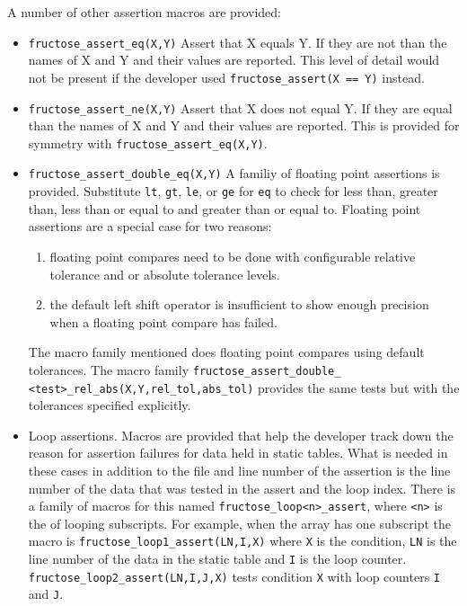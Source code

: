 \documentclass{book}
\begin{document}
A number of other assertion macros are provided:

\begin{itemize}
\item {\tt fructose\_assert\_eq(X,Y)}\hfil\break
Assert that X equals Y. If they are not than the names
of X and Y and their values are reported.
This level of detail would not be present if the
developer used\hfil\break
{\tt fructose\_assert(X == Y)} instead.

\item {\tt fructose\_assert\_ne(X,Y)}\hfil\break
Assert that X does not equal Y. If they are equal than the names
of X and Y and their values are reported.
This is provided for symmetry with 
{\tt fructose\_assert\_eq(X,Y)}.

\item {\tt fructose\_assert\_double\_eq(X,Y)}\hfil\break
A familiy of floating point assertions is provided.
Substitute {\tt lt}, {\tt gt},
{\tt le}, or {\tt ge} for {\tt eq} to check for less than,
greater than, less than or equal to and greater than or
equal to.
Floating point assertions are a special case for two reasons:
\begin{enumerate}
\item floating point compares need to be done with configurable relative
tolerance and or absolute tolerance levels. 
\item the default left shift operator is insufficient to show enough
precision when a floating point compare has failed. 
\end{enumerate}
The macro family mentioned 
does floating point compares using default tolerances.
The macro family\hfil\break
{\tt fructose\_assert\_double\_}
{\tt<test>\_rel\_abs(X,Y,rel\_tol,abs\_tol)}
provides the same tests but with the tolerances specified explicitly.

\item Loop assertions. \hfil\break
Macros are provided that help the developer track down the
reason for assertion failures for data held in static tables.
What is needed in these cases in addition to the file and line
number of the assertion is the line number of the data that
was tested in the assert and the loop index.
There is a family of macros for this named
{\tt fructose\_loop<n>\_assert}, where {\tt <n>} is the
of looping subscripts. For example, when the array has one subscript
the macro is {\tt fructose\_loop1\_assert(LN,I,X)}
where {\tt X} is the condition, {\tt LN} is the line number
of the data in the static table and {\tt I} is the loop counter.
{\tt fructose\_loop2\_assert(LN,I,J,X)} tests condition {\tt X}
with loop counters {\tt I} and {\tt J}.


\end{itemize}
\end{document}
